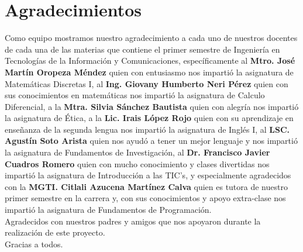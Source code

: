\documentclass[conference]{IEEEtran}
\begin{document}
\section{Agradecimientos}
 Como equipo mostramos nuestro agradecimiento a cada uno de nuestros docentes de cada una de las materias que contiene el primer semestre de Ingeniería  en Tecnologías de la Información y Comunicaciones, específicamente al \textbf{Mtro. José Martín Oropeza Méndez} quien con entusiasmo nos impartió la asignatura de Matemáticas Discretas I, al \textbf{Ing. Giovany Humberto Neri Pérez} quien con sus conocimientos en matemáticas nos impartió la asignatura de Calculo Diferencial, a la \textbf{Mtra. Silvia Sánchez Bautista} quien con alegría nos impartió la asignatura de Ética, a la \textbf{Lic. Irais López Rojo} quien con su aprendizaje en enseñanza de la segunda lengua nos impartió la asignatura de Inglés I, al \textbf{LSC. Agustín Soto Arista} quien nos ayudó a tener un mejor lenguaje y nos impartió la asignatura de Fundamentos de Investigación, al \textbf{Dr. Francisco Javier Cuadros Romero} quien con mucho conocimiento y clases divertidas nos impartió la asignatura de Introducción a las TIC's, y especialmente agradecidos con la \textbf{MGTI. Citlali Azucena Martínez Calva} quien es tutora de nuestro primer semestre en la carrera y, con sus conocimientos y apoyo extra-clase nos impartió la asignatura de Fundamentos de Programación.\\
 Agradecidos con nuestros padres y amigos que nos apoyaron durante la realización de este proyecto.\\
 Gracias a todos.
\end{document}
